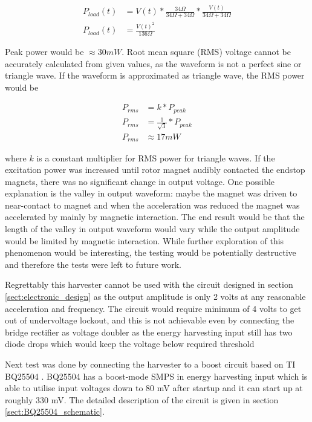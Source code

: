 \begin{equation}
\begin{split}
  P_{load}(t)& = V(t) * \frac{ 34 \Omega }{ 34 \Omega + 34 \Omega } * \frac{ V(t) }{ 34 \Omega + 34 \Omega } \\
  P_{load}(t)& = \frac{V(t)^2}{136 \Omega}
\end{split}
\end{equation}

Peak power would be $ \approx 30 mW $. Root mean square (RMS) voltage cannot be accurately calculated from given values, as the waveform is not a perfect sine or triangle wave. If the waveform is approximated as triangle wave, the RMS power would be 

\begin{equation} \label{eq:rms_power}
\begin{split}
  P_{rms}& = k * P_{peak} \\
  P_{rms}& = \frac{1}{\sqrt{3}} * P_{peak} \\
  P_{rms}& \approx 17 mW 
\end{split}
\end{equation}

where $k$ is a constant multiplier for RMS power for triangle waves. 
If the excitation power was increased until rotor magnet audibly contacted the endstop magnets, there was no significant change in output voltage. One possible explanation is the valley in output waveform: maybe the magnet was driven to near-contact to magnet and when the acceleration was reduced the magnet was accelerated by mainly by magnetic interaction. The end result would be that the length of the valley in output waveform would vary while the output amplitude would be limited by magnetic interaction. While further exploration of this phenomenon would be interesting, the testing would be potentially destructive and therefore the tests were left to future work.

Regrettably this harvester cannot be used with the circuit designed in section \ref{sect:electronic_design} as the output amplitude is only 2 volts at any reasonable acceleration and frequency. The circuit would require minimum of 4 volts to get out of undervoltage lockout, and this is not achievable even by connecting the bridge rectifier as voltage doubler as the energy harvesting input still has two diode drops which would keep the voltage below required threshold

Next test was done by connecting the harvester to a boost circuit based on TI BQ25504 \cite{BQ25504}. BQ25504 has a boost-mode SMPS in energy harvesting input which is able to utilise input voltages down to 80 mV after startup and it can start up at roughly 330 mV. The detailed description of the circuit is given in section \ref{sect:BQ25504_schematic}.

